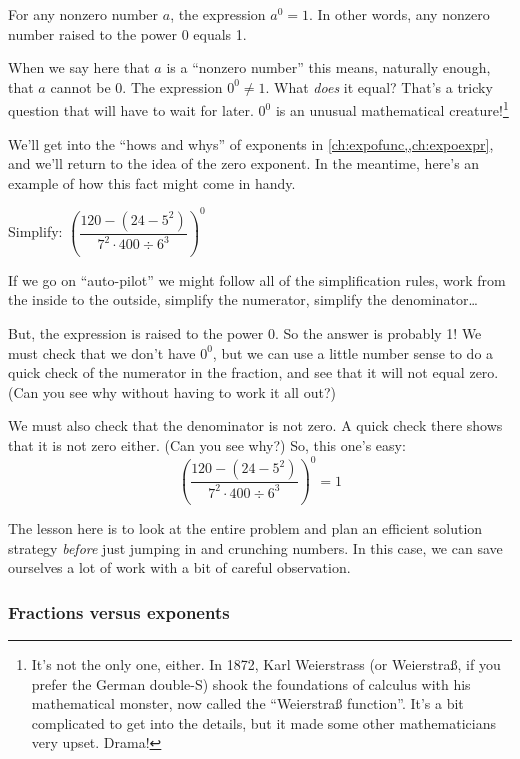 \begin{boxdef}
For any nonzero number $a$, the expression $a^0 = 1$. In other words, any nonzero number raised to the power 0 equals 1.
\end{boxdef}

When we say here that $a$ is a ``nonzero number'' this means, naturally enough, that $a$ cannot be 0. The expression $0^0 \neq 1$. What \textit{does} it equal? That's a tricky question that will have to wait for later. $0^0 $ is an unusual mathematical creature!\footnote{It's not the only one, either. In 1872, Karl Weierstrass (or Weierstra\ss, if you prefer the German double-S) shook the foundations of calculus with his mathematical monster, now called the ``Weierstra\ss{} function''. It's a bit complicated to get into the details, but it made some other mathematicians very upset. Drama!}

We'll get into the ``hows and whys'' of exponents in \cref{ch:expofunc,,ch:expoexpr}, and we'll return to the idea of the zero exponent. In the meantime, here's an example of how this fact might come in handy.

\begin{boxex}
Simplify: $\left( \dfrac{120-(24-5^2)}{7^2 \cdot 400 \div 6^3} \right)^0$

\exsoln If we go on ``auto-pilot'' we might follow all of the simplification rules, work from the inside to the outside, simplify the numerator, simplify the denominator\ldots

But, the expression is raised to the power 0. So the answer is probably 1! We must check that we don't have $0^0$, but we can use a little number sense to do a quick check of the numerator in the fraction, and see that it will not equal zero. (Can you see why without having to work it all out?)

We must also check that the denominator is not zero. A quick check there shows that it is not zero either. (Can you see why?) So, this one's easy:
\[\left( \frac{120-(24-5^2)}{7^2 \cdot 400 \div 6^3} \right)^0 = 1\]
\end{boxex}

The lesson here is to look at the entire problem and plan an efficient solution strategy \textit{before} just jumping in and crunching numbers. In this case, we can save ourselves a lot of work with a bit of careful observation.

\subsubsection{Fractions versus exponents}

